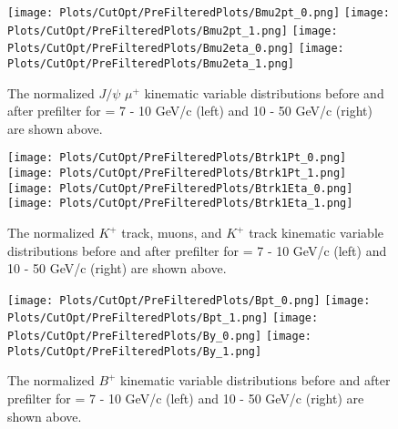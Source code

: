 \clearpage

\begin{figure}[h]
\begin{center}
\texttt{[image: Plots/CutOpt/PreFilteredPlots/Bmu2pt\_0.png]}
\texttt{[image: Plots/CutOpt/PreFilteredPlots/Bmu2pt\_1.png]}
\texttt{[image: Plots/CutOpt/PreFilteredPlots/Bmu2eta\_0.png]}
\texttt{[image: Plots/CutOpt/PreFilteredPlots/Bmu2eta\_1.png]}
\caption{The normalized $J/\psi$ $\mu^+$ kinematic variable distributions before and after prefilter for \pt = 7 - 10 GeV/c (left) and 10 - 50 GeV/c (right) are shown above.}
\label{fig:KinematicsDisMuon2}
\end{center}
\end{figure}



\clearpage

\begin{figure}[h]
\begin{center}
\texttt{[image: Plots/CutOpt/PreFilteredPlots/Btrk1Pt\_0.png]}
\texttt{[image: Plots/CutOpt/PreFilteredPlots/Btrk1Pt\_1.png]}
\texttt{[image: Plots/CutOpt/PreFilteredPlots/Btrk1Eta\_0.png]}
\texttt{[image: Plots/CutOpt/PreFilteredPlots/Btrk1Eta\_1.png]}
\caption{The normalized $K^+$ track, muons, and $K^+$ track kinematic variable distributions before and after prefilter for \pt = 7 - 10 GeV/c (left) and 10 - 50 GeV/c (right) are shown above.}
\label{fig:KinematicsDisKaon}
\end{center}
\end{figure}

\clearpage

\begin{figure}[h]
\begin{center}
\texttt{[image: Plots/CutOpt/PreFilteredPlots/Bpt\_0.png]}
\texttt{[image: Plots/CutOpt/PreFilteredPlots/Bpt\_1.png]}
\texttt{[image: Plots/CutOpt/PreFilteredPlots/By\_0.png]}
\texttt{[image: Plots/CutOpt/PreFilteredPlots/By\_1.png]}
\caption{The normalized  $B^+$ kinematic variable distributions before and after prefilter for \pt = 7 - 10 GeV/c (left) and 10 - 50 GeV/c (right) are shown above.}
\label{fig:KinematicsDisBP}
\end{center}
\end{figure}
\clearpage

